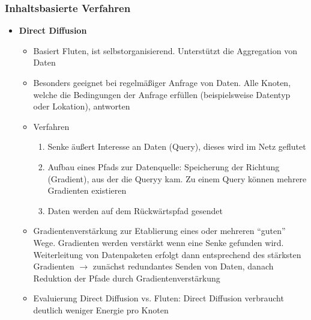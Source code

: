 \subsubsection{Inhaltsbasierte Verfahren}
\begin{itemize}
	\item \textbf{Direct Diffusion}
	\begin{itemize}
		\item Basiert Fluten, ist selbstorganisierend. Unterstützt die Aggregation von Daten
		\item Besonders geeignet bei regelmäßiger Anfrage von Daten. Alle Knoten, welche die Bedingungen der Anfrage erfüllen (beispielsweise Datentyp oder Lokation), antworten
		\item Verfahren
		\begin{enumerate}
			\item Senke äußert Interesse an Daten (Query), dieses wird im Netz geflutet
			\item Aufbau eines Pfads zur Datenquelle: Speicherung der Richtung (Gradient), aus der die Queryy kam. Zu einem Query können mehrere Gradienten existieren
			\item Daten werden auf dem Rückwärtspfad gesendet
		\end{enumerate}
		\item Gradientenverstärkung zur Etablierung eines oder mehreren "`guten"' Wege. Gradienten werden verstärkt wenn eine Senke gefunden wird. Weiterleitung von Datenpaketen erfolgt dann entsprechend des stärksten Gradienten \(\rightarrow\) zunächst redundantes Senden von Daten, danach Reduktion der Pfade durch Gradientenverstärkung
		\item Evaluierung Direct Diffusion vs. Fluten: Direct Diffusion verbraucht deutlich weniger Energie pro Knoten
	\end{itemize}
\end{itemize}

